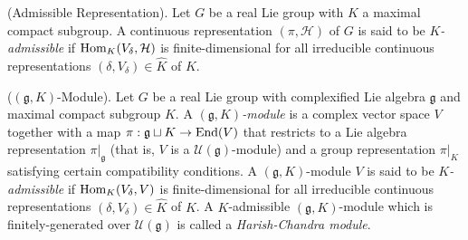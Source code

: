 \noindent\begin{definition}\textup{(Admissible Representation).} Let $G$ be a real Lie group with $K$ a maximal compact subgroup. A continuous representation $(\pi, \mathcal{H})$ of $G$ is said to be {\em $K$-admissible} if $\textup{Hom}_K(V_\delta, \mathcal{H})$ is finite-dimensional for all irreducible continuous representations $(\delta, V_\delta) \in \widehat{K}$ of $K$.\\%
\end{definition}

\noindent\begin{definition}\textup{($(\mathfrak{g}, K)$-Module).} Let $G$ be a real Lie group with complexified Lie algebra $\mathfrak{g}$ and maximal compact subgroup $K$. A {\em $(\mathfrak{g}, K)$-module} is a complex vector space $V$ together with a map ${\pi : \mathfrak{g} \sqcup K \to \textup{End}(V)}$ that restricts to a Lie algebra representation $\pi\vert_\mathfrak{g}$ (that is, $V$ is a $\mathcal{U}(\mathfrak{g})$-module) and a group representation $\pi\vert_K$ satisfying certain compatibility conditions. A $(\mathfrak{g}, K)$-module $V$ is said to be {\em $K$-admissible} if $\textup{Hom}_K(V_\delta, V)$ is finite-dimensional for all irreducible continuous representations $(\delta, V_\delta) \in \widehat{K}$ of $K$. A $K$-admissible $(\mathfrak{g}, K)$-module which is finitely-generated over $\mathcal{U}(\mathfrak{g})$ is called a {\em Harish-Chandra module}.\\ %
\end{definition}

